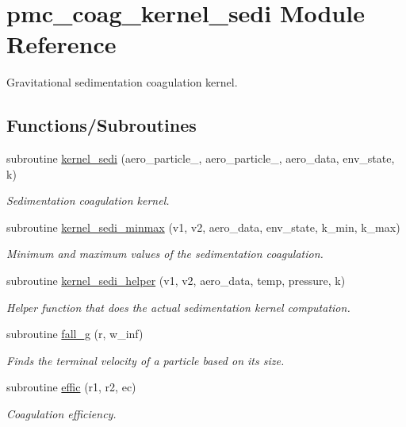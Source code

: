 \hypertarget{namespacepmc__coag__kernel__sedi}{}\section{pmc\+\_\+coag\+\_\+kernel\+\_\+sedi Module Reference}
\label{namespacepmc__coag__kernel__sedi}


Gravitational sedimentation coagulation kernel.  


\subsection*{Functions/\+Subroutines}
\begin{DoxyCompactItemize}
\item 
subroutine \mbox{\hyperlink{namespacepmc__coag__kernel__sedi_a2c2e6a3e75e04aa6d816b77d06548612}{kernel\+\_\+sedi}} (aero\+\_\+particle\+\_, aero\+\_\+particle\+\_, aero\+\_\+data, env\+\_\+state, k)
\begin{DoxyCompactList}\small\item\em Sedimentation coagulation kernel. \end{DoxyCompactList}\item 
subroutine \mbox{\hyperlink{namespacepmc__coag__kernel__sedi_aee04f9e9aa69bade2895e9dc24e78c57}{kernel\+\_\+sedi\+\_\+minmax}} (v1, v2, aero\+\_\+data, env\+\_\+state, k\+\_\+min, k\+\_\+max)
\begin{DoxyCompactList}\small\item\em Minimum and maximum values of the sedimentation coagulation. \end{DoxyCompactList}\item 
subroutine \mbox{\hyperlink{namespacepmc__coag__kernel__sedi_a6af5810c7b64984bc575402ad7d02851}{kernel\+\_\+sedi\+\_\+helper}} (v1, v2, aero\+\_\+data, temp, pressure, k)
\begin{DoxyCompactList}\small\item\em Helper function that does the actual sedimentation kernel computation. \end{DoxyCompactList}\item 
subroutine \mbox{\hyperlink{namespacepmc__coag__kernel__sedi_a4fd035b7ac68a481cfdbb49b3a434bf8}{fall\+\_\+g}} (r, w\+\_\+inf)
\begin{DoxyCompactList}\small\item\em Finds the terminal velocity of a particle based on its size. \end{DoxyCompactList}\item 
subroutine \mbox{\hyperlink{namespacepmc__coag__kernel__sedi_a41fae90a487c95876488cbbeb83d07e9}{effic}} (r1, r2, ec)
\begin{DoxyCompactList}\small\item\em Coagulation efficiency. \end{DoxyCompactList}\end{DoxyCompactItemize}


